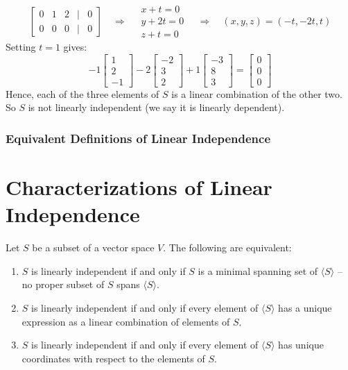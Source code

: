 \documentclass[a4paper, 9pt]{extarticle}
\begin{document}
\begin{examplebox}{}{}
$$\begin{bmatrix}
      0 & 1 & 2 & | & 0 \\
      0 & 0 & 0 & | & 0
    \end{bmatrix}
    \quad\Longrightarrow\quad
    \begin{array}{l}
      x  + t = 0 \\
      y + 2t = 0 \\
      z + t = 0
    \end{array}
    \quad\Longrightarrow\quad
    (x,y,z) = (-t, -2t, t)
  $$
  Setting $t = 1$ gives:
  $$
    -1 \begin{bmatrix}
      1 \\
      2 \\
      -1
    \end{bmatrix}
    -2 \begin{bmatrix}
      -2 \\
      3  \\
      2
    \end{bmatrix}
    +1 \begin{bmatrix}
      -3 \\
      8  \\
      3
    \end{bmatrix}
    =
    \begin{bmatrix}
      0 \\
      0 \\
      0
    \end{bmatrix}
  $$
  Hence, each of the three elements of $S$ is a linear combination of the other two. So $S$ is not linearly independent (we say it is linearly dependent).
\end{examplebox}
\subsubsection{Equivalent Definitions of Linear Independence}
\section{Characterizations of Linear Independence}

\begin{theorembox}
  Let $S$ be a subset of a vector space $V$. The following are equivalent:
  \begin{enumerate}
    \item $S$ is linearly independent if and only if $S$ is a minimal spanning set of $\langle S \rangle$ -- no proper subset of $S$ spans $\langle S \rangle$.

    \item $S$ is linearly independent if and only if every element of $\langle S \rangle$ has a unique expression as a linear combination of elements of $S$.

    \item $S$ is linearly independent if and only if every element of $\langle S \rangle$ has unique coordinates with respect to the elements of $S$.
  \end{enumerate}
\end{theorembox}
\end{document}

